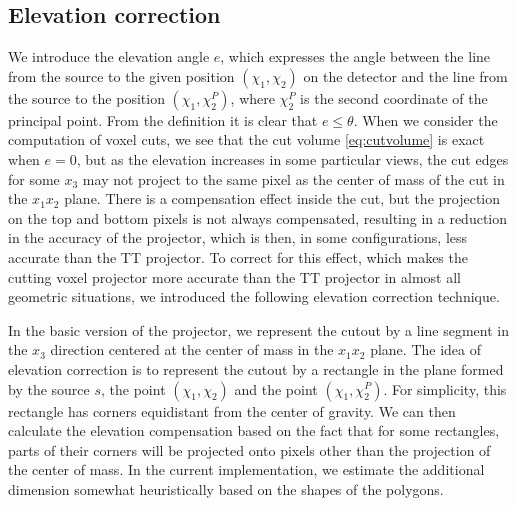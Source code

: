 \subsection{Elevation correction}
We introduce the elevation angle $e$, which expresses the angle between the line from the source to the given position $(\chi_1, \chi_2)$ on the detector and the line from the source to the position $(\chi_1, \chi_2^P)$, where $\chi_2^P$ is the second coordinate of the principal point. From the definition it is clear that $e \leq \theta$. When we consider the computation of voxel cuts, we see that the cut volume \eqref{eq:cutvolume} is exact when $e=0$, but as the elevation increases in some particular views, the cut edges for some $x_3$ may not project to the same pixel as the  center of mass of the cut in the $x_1 x_2$ plane. There is a compensation effect inside the cut, but the projection on the top and bottom pixels is not always compensated, resulting in a reduction in the accuracy of the projector, which is then, in some configurations, less accurate than the TT projector. To correct for this effect, which makes the cutting voxel projector more accurate than the TT projector in almost all geometric situations, we introduced the following elevation correction technique.

In the basic version of the projector, we represent the cutout by a line segment in the $x_3$ direction centered at the center of mass in the $x_1 x_2$ plane. The idea of elevation correction is to represent the cutout by a rectangle in the plane formed by the source $s$, the point $(\chi_1, \chi_2)$ and the point $(\chi_1, \chi_2^P)$. For simplicity, this rectangle has corners equidistant from the center of gravity. We can then calculate the elevation compensation based on the fact that for some rectangles, parts of their corners will be projected onto pixels other than the projection of the center of mass. In the current implementation, we estimate the additional dimension somewhat heuristically based on the shapes of the polygons.

